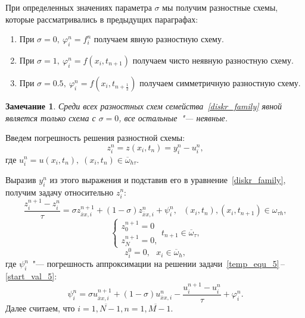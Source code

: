 \documentclass[11pt,a4paper,twoside]{report}
\numberwithin{equation}{section}
\theoremstyle{definition}
\theoremstyle{plain}
\newtheorem*{note*}{Замечание}
\begin{document}
\noindent
При определенных значениях параметра $\sigma$ мы получим разностные схемы,
которые рассматривались в предыдущих параграфах:
%
\begin{enumerate}
%
    \item
    При $\sigma = 0, ~\varphi_i^n = f_i^n$ получаем явную разностную схему.
    \item
    При $\sigma = 1, ~\varphi_i^n = f(x_i,t_{n+1})$ получаем чисто неявную
    разностную схему.
    \item
    При $\sigma = 0.5, ~\varphi_i^n = f(x_i,t_{n + \frac12})$ получаем симметричную
    разностную схему.
%
\end{enumerate}
%
\begin{note*}
%
    Среди всех разностных схем семейства~\eqref{diskr_family} явной является только
    схема с $\sigma = 0$, все остальные~"--- неявные.
%
\end{note*}
%
Введем погрешность решения разностной схемы:
%
$$
    z_i^n = z(x_i, t_n) = y_i^n - u_i^n,
$$
%
где $u_i^n = u(x_i, t_n),\;(x_i, t_n) \in \overline{\omega}_{h \tau}.$

Выразив $y_i^n$ из этого выражения и подставив его в уравнение~\eqref{diskr_family},
получим задачу относительно $z_i^n$:
\begin{equation}
    \label{z_eq_5}
    \frac{z_i^{n+1} - z_i^n}{\tau} = \sigma z^{n+1}_{\overline{x}x,i} + (1 - \sigma)
    z^{n}_{\overline{x}x,i} + \psi_i^n,~~~(x_i, t_n), (x_i, t_{n+1})\in \omega_{\tau h},
\end{equation}
%
\begin{equation}
    \label{z_board_5}
    \begin{cases}
        z_0^{n+1} = 0 \\
        z_N^{n+1} = 0,
    \end{cases}
    t_{n+1}\in \overline{\omega}_{\tau},
\end{equation}
%
\begin{equation}
    \label{z_start_5}
    z_i^0 = 0,~~~x_i\in \overline{\omega}_h,
\end{equation}
%
где $\psi_i^n$~"--- погрешность аппроксимации на решении
задачи~\eqref{temp_equ_5}\,--\,\eqref{start_val_5}:
%
\begin{equation}
%
    \label{approx_temp_5}
    \psi_i^n = \sigma u_{\overline{x}x,i}^{n+1} + (1-\sigma) u_{\overline{x}x,i}^n -
    \dfrac{u_i^{n+1} - u_i^n}{\tau} + \varphi_i^n.
%
\end{equation}
%
Далее считаем, что $i=\overline{1,N-1}, n=\overline{1,M-1}$.
\end{document}
